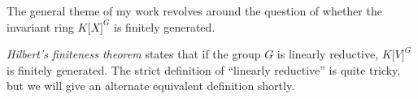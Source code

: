 The general theme of my work revolves around the question of whether the invariant ring $ K\lbrack X\rbrack^G $ is finitely generated.

\textit{Hilbert's finiteness theorem} states that if the group $G$ is linearly reductive, $ K\lbrack V\rbrack^G $ is finitely generated.
The strict definition of ``linearly reductive'' is quite tricky, but we will give an alternate equivalent definition shortly.

